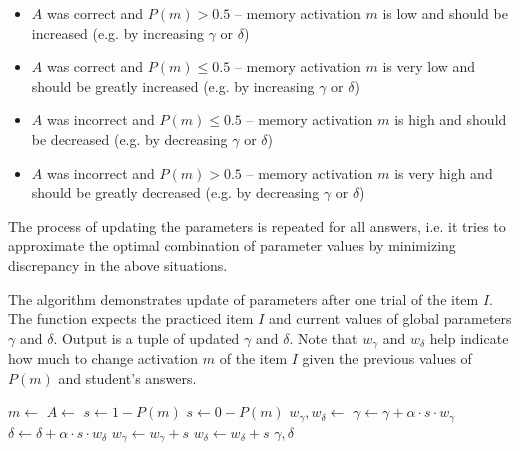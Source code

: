 \begin{itemize}
  \item $A$ was correct and $P(m) > 0.5$ -- memory activation $m$ is low and should be increased (e.g. by increasing $\gamma$ or $\delta$)
  \item $A$ was correct and $P(m) \leq 0.5$ -- memory activation $m$ is very low and should be greatly increased (e.g. by increasing $\gamma$ or $\delta$)
  \item $A$ was incorrect and $P(m) \leq 0.5$ -- memory activation $m$ is high and should be decreased (e.g. by decreasing $\gamma$ or $\delta$)
  \item $A$ was incorrect and $P(m) > 0.5$ -- memory activation $m$ is very high and should be greatly decreased (e.g. by decreasing $\gamma$ or $\delta$)
\end{itemize}

The process of updating the parameters is repeated for all answers, i.e. it tries to approximate the optimal combination of parameter values by minimizing discrepancy in the above situations.

\begin{algorithm}
  \caption{The algorithm demonstrates update of parameters after one trial of the item $I$. The function expects the practiced item $I$ and current values of global parameters $\gamma$ and $\delta$. Output is a tuple of updated $\gamma$ and $\delta$. Note that $w_{\gamma}$ and $w_{\delta}$ help indicate how much to change activation $m$ of the item $I$ given the previous values of $P(m)$ and student's answers.}
  \label{alg-gradient-descent}
  \begin{algorithmic}[1]
      \State $m \gets$  
      \State $A \gets$  
       
        \State $s \gets 1 - P(m)$
      \Else
        \State $s \gets 0 - P(m)$
      \EndIf
      \State $w_{\gamma}, w_{\delta} \gets$  
      \State $\gamma \gets \gamma + \alpha \cdot s \cdot w_{\gamma}$ 
      \State $\delta \gets \delta + \alpha \cdot s \cdot w_{\delta}$
        \State $w_{\gamma} \gets w_{\gamma} + s$
      \Else
        \State $w_{\delta} \gets w_{\delta} + s$
      \EndIf
      \State {} 
      \State \Return $\gamma, \delta$
    \EndFunction
  \end{algorithmic}
\end{algorithm}

